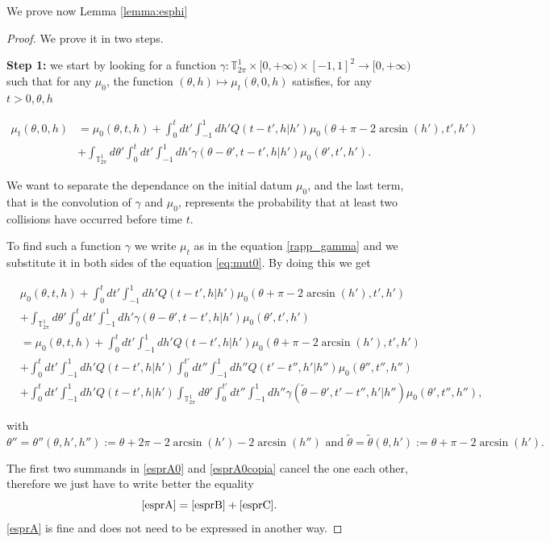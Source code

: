 \documentclass[a4paper,10pt,reqno]{amsart}
\numberwithin{equation}{subsection}
\numberwithin{figure}{subsection}
\begin{document}
We prove now Lemma \ref{lemma:esphi}
\begin{proof} We prove it in two steps.

\textbf{Step 1:} we start by looking for a function $\gamma:\mathbb{T}^1_{2\pi}\times[0,+\infty)\times[-1,1]^2\to[0,+\infty)$ such that for any $\mu_0$, the function $(\theta,h)\mapsto\mu_t(\theta,0,h)$ satisfies, for any $t>0,\theta,h$

\begin{align}
\nonumber\mu_t(\theta,0,h)&=\mu_0(\theta,t,h)+\int_0^tdt'\int_{-1}^1dh'Q(t-t',h|h')\mu_0(\theta+\pi-2\arcsin(h'),t',h')
\\
\label{rapp_gamma}&+\int_{\mathbb{T}^1_{2\pi}}d\theta'\int_0^tdt'\int_{-1}^1dh'\gamma(\theta-\theta',t-t',h|h')\mu_0(\theta',t',h').
\end{align}

We want to separate the dependance on the initial datum $\mu_0$, and the last term, that is the convolution of $\gamma$ and $\mu_0$, represents the probability that at least two collisions have occurred before time $t$.

To find such a function $\gamma$ we write $\mu_t$ as in the equation \eqref{rapp_gamma} and we substitute it in both sides of the equation \eqref{eq:mut0}. By doing this we get

{\scriptsize\begin{align}
\label{esprA0}&\mu_0(\theta,t,h)+\int_0^tdt'\int_{-1}^1dh'Q(t-t',h|h')\mu_0(\theta+\pi-2\arcsin(h'),t',h')
\\
\label{esprA}&+\int_{\mathbb{T}^1_{2\pi}}d\theta'\int_0^tdt'\int_{-1}^1dh'\gamma(\theta-\theta',t-t',h|h')\mu_0(\theta',t',h')
\\
\label{esprA0copia}&=\mu_0(\theta,t,h)+\int_0^tdt'\int_{-1}^1dh'Q(t-t',h|h')\mu_0(\theta+\pi-2\arcsin(h'),t',h')
\\
\label{esprB}&+\int_0^tdt'\int_{-1}^1dh'Q(t-t',h|h')\int_0^{t'}dt''\int_{-1}^1dh''Q(t'-t'',h'|h'')\mu_0(\theta'',t'',h'')
\\
\label{esprC}&+\int_0^tdt'\int_{-1}^1dh'Q(t-t',h|h')\int_{\mathbb{T}^1_{2\pi}}d\theta'\int_0^{t'}dt''\int_{-1}^1dh''\gamma(\tilde\theta-\theta',t'-t'',h'|h'')\mu_0(\theta',t'',h''),
\end{align}}

with
{\footnotesize\[
\theta''=\theta''(\theta,h',h''):=\theta+2\pi-2\arcsin(h')-2\arcsin(h'')\textrm{ and }\tilde\theta=\tilde\theta(\theta,h'):=\theta+\pi-2\arcsin(h').
\]}

The first two summands in \eqref{esprA0} and \eqref{esprA0copia} cancel the one each other, therefore we just have to write better the equality
\[
\eqref{esprA}=\eqref{esprB}+\eqref{esprC}.
\]
\eqref{esprA} is fine and does not need to be expressed in another way.


\end{proof}
\end{document}
